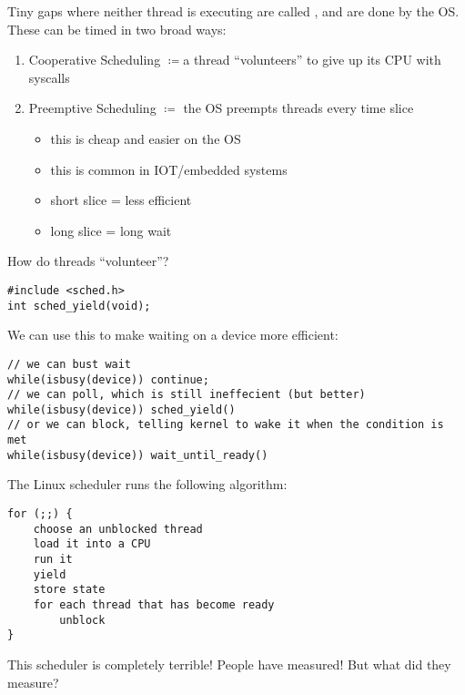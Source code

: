 \documentclass[../../lecture_notes.tex]{subfiles}
\begin{document}
Tiny gaps where neither thread is executing are called , and are done by the OS. These can be timed in two broad ways:
\begin{enumerate}
\item Cooperative Scheduling $\coloneqq$a thread “volunteers” to give up its CPU with syscalls
\item Preemptive Scheduling $\coloneqq$ the OS preempts threads every time slice
    \begin{itemize}
	\item this is cheap and easier on the OS
	\item this is common in IOT/embedded systems
	\item short slice = less efficient
	\item long slice = long wait
	\end{itemize}
\end{enumerate}


How do threads “volunteer”?
\begin{lstlisting}
#include <sched.h>
int sched_yield(void);
\end{lstlisting}


We can use this to make waiting on a device more efficient:
\begin{lstlisting}
// we can bust wait
while(isbusy(device)) continue;
// we can poll, which is still ineffecient (but better)
while(isbusy(device)) sched_yield()
// or we can block, telling kernel to wake it when the condition is met
while(isbusy(device)) wait_until_ready()
\end{lstlisting}


The Linux scheduler runs the following algorithm:
\begin{lstlisting}
for (;;) {
	choose an unblocked thread
	load it into a CPU
	run it
	yield
	store state
	for each thread that has become ready
		unblock
}
\end{lstlisting}
    

This scheduler is completely terrible!  People have measured! But what did they measure?

\begin{center}
\end{center}
\end{document}

